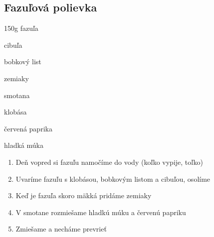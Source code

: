 \setcounter{step}{0}
\subsection{Fazuľová polievka}

\begin{ingredient}
\def\portions{4}%

\begin{main}
	\item 150g fazuľa
	\item cibuľa
	\item bobkový list
	\item zemiaky
	\item smotana
	\item klobása
	\item červená paprika
	\item hladká múka
\end{main}
\end{ingredient}
\begin{recipe}

\begin{enumerate}

\item{Deň vopred si fazuľu namočíme do vody (koľko vypije, toľko)}
\item{Uvaríme fazuľu s klobásou, bobkovým listom a cibuľou, osolíme}
\item{Keď je fazuľa skoro mäkká pridáme zemiaky}
\item{V smotane rozmiešame hladkú múku a červenú papriku}
\item{Zmiešame a necháme prevrieť}	

\end{enumerate}
\end{recipe}

\begin{notes}

\end{notes}
\clearpage	
